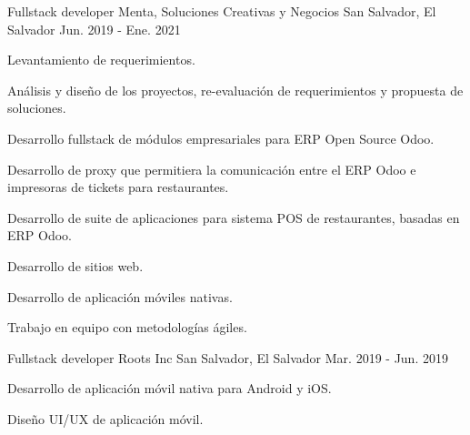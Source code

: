 \begin{cventries}
  \cventry
    {Fullstack developer} %
    {Menta, Soluciones Creativas y Negocios} %
    {San Salvador, El Salvador} %
    {Jun. 2019 - Ene. 2021} %
    {
      \begin{cvitems} %
        \item {Levantamiento de requerimientos.}
        \item {Análisis y diseño de los proyectos, re-evaluación de requerimientos y propuesta de soluciones.}
        \item {Desarrollo fullstack de módulos empresariales para ERP Open Source Odoo.}
        \item {Desarrollo de proxy que permitiera la comunicación entre el ERP Odoo e impresoras de tickets para restaurantes.}
        \item {Desarrollo de suite de aplicaciones para sistema POS de restaurantes, basadas en ERP Odoo.}
        \item {Desarrollo de sitios web.}
        \item {Desarrollo de aplicación móviles nativas.}
        \item {Trabajo en equipo con metodologías ágiles.}
      \end{cvitems}
    }

  \cventry
    {Fullstack developer} %
    {Roots Inc} %
    {San Salvador, El Salvador} %
    {Mar. 2019 - Jun. 2019} %
    {
      \begin{cvitems} %
        \item {Desarrollo de aplicación móvil nativa para Android y iOS.}
        \item {Diseño UI/UX de aplicación móvil. }
      \end{cvitems}
    }

\end{cventries}

